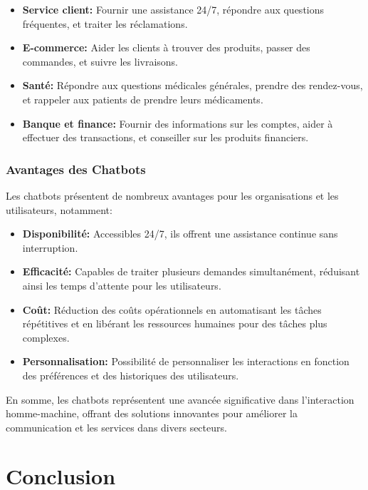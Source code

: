 \begin{itemize}
  \item \textbf{Service client: }Fournir une assistance 24/7, répondre aux questions fréquentes, et traiter les réclamations.
  \item \textbf{E-commerce: }Aider les clients à trouver des produits, passer des commandes, et suivre les livraisons.
  \item \textbf{Santé: }Répondre aux questions médicales générales, prendre des rendez-vous, et rappeler aux patients de prendre leurs médicaments.
  \item \textbf{Banque et finance: }Fournir des informations sur les comptes, aider à effectuer des transactions, et conseiller sur les produits financiers.
\end{itemize}

\subsubsection{Avantages des Chatbots}
\hspace{16pt}Les chatbots présentent de nombreux avantages pour les organisations et les utilisateurs, notamment:

\begin{itemize}
  \item \textbf{Disponibilité: }Accessibles 24/7, ils offrent une assistance continue sans interruption.
  \item \textbf{Efficacité: }Capables de traiter plusieurs demandes simultanément, réduisant ainsi les temps d'attente pour les utilisateurs.
  \item \textbf{Coût: }Réduction des coûts opérationnels en automatisant les tâches répétitives et en libérant les ressources humaines pour des tâches plus complexes.
  \item \textbf{Personnalisation: }Possibilité de personnaliser les interactions en fonction des préférences et des historiques des utilisateurs.
\end{itemize}

En somme, les chatbots représentent une avancée significative dans l'interaction homme-machine, offrant des solutions innovantes pour améliorer la communication et les services dans divers secteurs.




\newpage

\section*{Conclusion}


